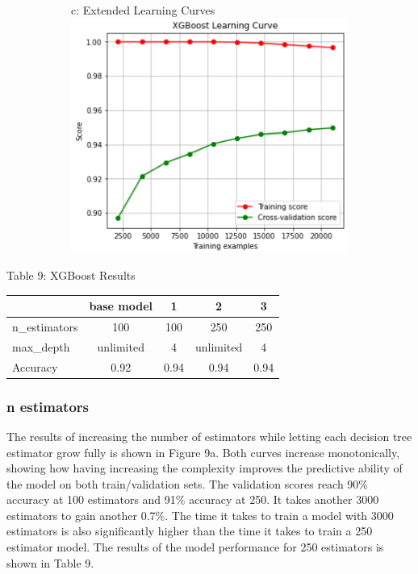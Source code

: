 \documentclass{article}
\begin{document}
\begin{figure}
\begin{subfigure}{.30\textwidth}
	\end{subfigure}
	\begin{subfigure}{.37\textwidth}
		\centering
		c: Extended Learning Curves\\
		\includegraphics[width=\linewidth]{mnist_xgboost_learning_30000.png}
		
	\end{subfigure}
	\label{fig:test}
\end{figure}
\begin{table}
	
	\centering
	Table 9: XGBoost Results\\
	\begin{tabular}{ l c c c c  }
		\hline
		& base model & 1 & 2 & 3\\
		\hline
		n\_estimators & 100 & 100 & 250 & 250 \\
		max\_depth & unlimited & 4 & unlimited & 4\\
		Accuracy & 0.92 & 0.94 & 0.94 & 0.94 \\
		
		
		\hline 
	\end{tabular}
\end{table}


\subsubsection*{n estimators}
The results of increasing the number of estimators while letting each decision tree estimator grow fully is shown in Figure 9a. Both curves increase monotonically, showing how having increasing the complexity improves the predictive ability of the model on both train/validation sets. The validation scores reach 90\% accuracy at 100 estimators and 91\% accuracy at 250. It takes another 3000 estimators to gain another 0.7\%. The time it takes to train a model with 3000 estimators is also significantly higher than the time it takes to train a 250 estimator model. The results of the model performance for 250 estimators is shown in Table 9. 
\end{document}
